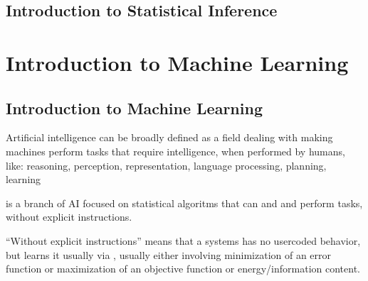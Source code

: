 \documentclass[letterpaper,10pt,english]{jupyterBook}
\begin{document}
\sphinxstepscope


\chapter{Introduction to Statistical Inference}
\label{\detokenize{ch/infer/intro:introduction-to-statistical-inference}}\label{\detokenize{ch/infer/intro:infer-intro}}\label{\detokenize{ch/infer/intro::doc}}
\sphinxstepscope


\part{Introduction to Machine Learning}

\sphinxstepscope


\chapter{Introduction to Machine Learning}
\label{\detokenize{ch/ml/intro:introduction-to-machine-learning}}\label{\detokenize{ch/ml/intro:ml-intro}}\label{\detokenize{ch/ml/intro::doc}}
\sphinxAtStartPar
Artificial intelligence can be broadly defined as a field dealing with making machines perform tasks that require intelligence, when performed by humans, like: reasoning, perception, representation, language processing, planning, learning

\sphinxAtStartPar
{} is a branch of AI focused on statistical algoritms that can  and  and perform tasks, without explicit instructions.%
\begin{footnote}[1]\sphinxAtStartFootnote
“Without explicit instructions” means that a systems has no user\sphinxhyphen{}coded behavior, but learns it usually via , usually either involving minimization of an error function or maximization of an objective function or energy/information content.
%
\end{footnote}
\end{document}
